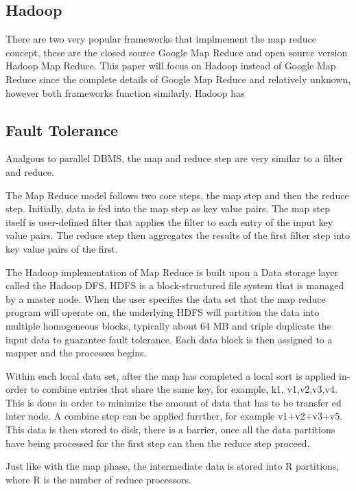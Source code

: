 \documentclass[10pt,twocolumn]{IEEEtran11}
\begin{document}
\subsection{Hadoop}
There are two very popular frameworks that implmement the map reduce concept, these are the closed source Google Map Reduce and open source version Hadoop Map Reduce.  
This paper will focus on Hadoop instead of Google Map Reduce since the complete details of Google Map Reduce and relatively unknown, however both frameworks function similarly.
Hadoop has 




\subsection{Fault Tolerance}





Analgous to parallel DBMS, the map and reduce step are very similar to a filter and reduce.




















The Map Reduce model follows two core steps, the map step and then the reduce step.  Initially, data is fed into the map step as key value pairs.  The map step itself is user-defined filter that applies the filter to each entry of the input key value pairs.  The reduce step then aggregates the results of the first filter step into key value pairs of the first.
\par
The Hadoop implementation of Map Reduce is built upon a Data storage layer called the Hadoop DFS.  HDFS is a block-structured file system that is managed by a master node.  When the user specifies the data set that the map reduce program will operate on, the underlying HDFS will partition the data into multiple homogeneous blocks, typically about 64 MB and triple duplicate the input data to guarantee fault tolerance.  Each data block is then assigned to a mapper and the processes begins.
\par
Within each local data set, after the map has completed a local sort is applied in-order to combine entries that share the same key, for example, {k1, v1,v2,v3,v4}.  This is done in order to minimize the amount of data that has to be transfer ed inter node. A combine step can be applied furrther, for example v1+v2+v3+v5.  This data is then stored to disk, there is a barrier, once all the data partitions have being processed for the first step can then the reduce step proceed.  
\par
Just like with the map phase, the intermediate data is stored into R partitions, where R is the number of reduce processors.
\end{document}
